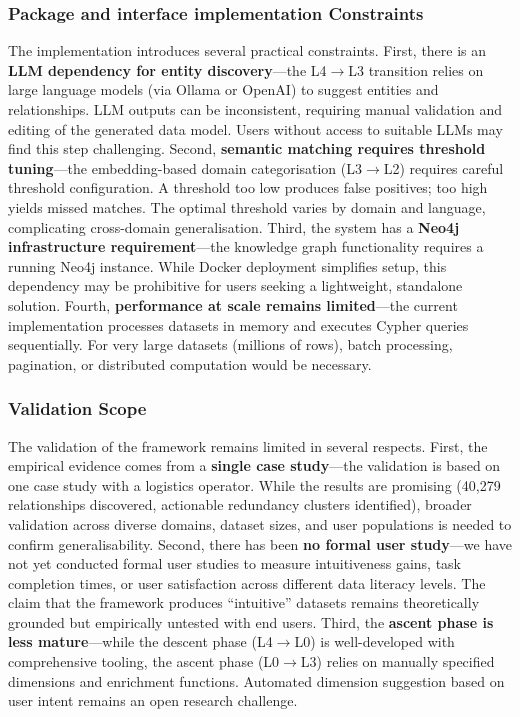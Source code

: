 \documentclass[12pt,a4paper]{article}
\begin{document}
\subsubsection{Package and interface implementation Constraints}

The implementation introduces several practical constraints. First, there is an \textbf{LLM dependency for entity discovery}---the L4$\to$L3 transition relies on large language models (via Ollama or OpenAI) to suggest entities and relationships. LLM outputs can be inconsistent, requiring manual validation and editing of the generated data model. Users without access to suitable LLMs may find this step challenging. Second, \textbf{semantic matching requires threshold tuning}---the embedding-based domain categorisation (L3$\to$L2) requires careful threshold configuration. A threshold too low produces false positives; too high yields missed matches. The optimal threshold varies by domain and language, complicating cross-domain generalisation. Third, the system has a \textbf{Neo4j infrastructure requirement}---the knowledge graph functionality requires a running Neo4j instance. While Docker deployment simplifies setup, this dependency may be prohibitive for users seeking a lightweight, standalone solution. Fourth, \textbf{performance at scale remains limited}---the current implementation processes datasets in memory and executes Cypher queries sequentially. For very large datasets (millions of rows), batch processing, pagination, or distributed computation would be necessary.

\subsubsection{Validation Scope}

The validation of the framework remains limited in several respects. First, the empirical evidence comes from a \textbf{single case study}---the validation is based on one case study with a logistics operator. While the results are promising (40,279 relationships discovered, actionable redundancy clusters identified), broader validation across diverse domains, dataset sizes, and user populations is needed to confirm generalisability. Second, there has been \textbf{no formal user study}---we have not yet conducted formal user studies to measure intuitiveness gains, task completion times, or user satisfaction across different data literacy levels. The claim that the framework produces ``intuitive'' datasets remains theoretically grounded but empirically untested with end users. Third, the \textbf{ascent phase is less mature}---while the descent phase (L4$\to$L0) is well-developed with comprehensive tooling, the ascent phase (L0$\to$L3) relies on manually specified dimensions and enrichment functions. Automated dimension suggestion based on user intent remains an open research challenge.
\end{document}
